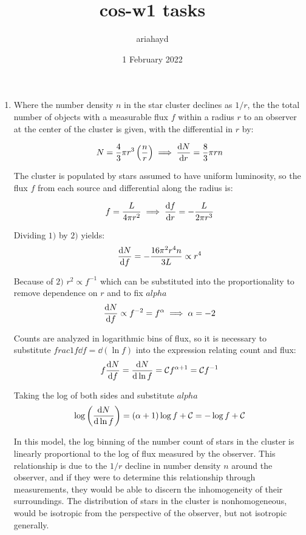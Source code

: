 \documentclass{paper}
\title{cos-w1 tasks}
\author{ariahayd}
\date{1 February 2022}
\begin{document}
 

\maketitle

\begin{enumerate}
    \item %
      Where the number density \(n\) in the star cluster declines as 
      \(1/r\), the the total number of objects with a measurable flux 
      \(f\) within a radius \(r\) to an observer at the center of the cluster 
      is given, with the differential in \(r\) by: 

      \begin{equation}
        N = \frac{4}{3} \pi r^3 \left( \frac{n}{r} \right) \implies 
        \dv{N}{r} = \frac{8}{3} \pi r n
      \end{equation}

      The cluster is populated by stars assumed to have uniform luminosity, 
      so the flux \(f\) from each source and differential along the radius is:

      \begin{equation}
        f = \frac{L}{4 \pi r^2} \implies \dv{f}{r} = -\frac{L}{2 \pi r^3}
      \end{equation}

      Dividing \(1)\) by \(2)\) yields:
      \[ \dv{N}{f} = -\frac{16 \pi^2 r^4 n }{3 L} \propto r^4 \]

      Because of \(2)\) \(r^2 \propto f^{-1}\) which can be substituted into 
      the proportionality to remove dependence on \(r\) and to fix \(alpha\)
      \[  \dv{N}{f} \propto f^{-2} = f^{\alpha} \implies \alpha = -2 \]

      Counts are analyzed in logarithmic bins of flux, so it is necessary to
      substitute \(frac{1}{f}\dd{f} = \dd{(\ln{f})}\) into the expression 
      relating count and flux:
      \[ f \dv{N}{f} = \dv{N}{\ln{f}}
      = \mathcal{C} f^{\alpha + 1} = \mathcal{C} f^{-1} \]

      Taking the log of both sides and substitute \(alpha\)
      \[ \log{\left(\dv{N}{\ln{f}}\right)} = (\alpha + 1)\log{f} + \mathcal{C}
      = -\log{f} + \mathcal{C} \]

      In this model, the log binning of the number count of stars in the
      cluster is linearly proportional to the log of flux measured by
      the observer. This relationship is due to the \(1/r\) decline in number
      density \(n\) around the observer, and if they were to determine this
      relationship through measurements, they would be able to discern the
      inhomogeneity of their surroundings. The distribution of stars in the
      cluster is nonhomogeneous, would be isotropic from the perspective of 
      the observer, but not isotropic generally.


\end{enumerate}
\end{document}

